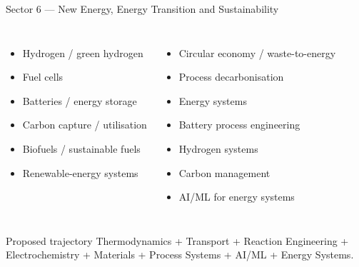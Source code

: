 \documentclass[aspectratio=169,11pt]{beamer}
\begin{document}
\begin{frame}{Sector 6 — New Energy, Energy Transition and Sustainability}
\begin{columns}[T]
\begin{itemize}
\item Hydrogen / green hydrogen
\item Fuel cells
\item Batteries / energy storage
\item Carbon capture / utilisation
\item Biofuels / sustainable fuels
\item Renewable-energy systems
\end{itemize}
\begin{itemize}
\item Circular economy / waste-to-energy
\item Process decarbonisation
\item Energy systems
\item Battery process engineering
\item Hydrogen systems
\item Carbon management
\item AI/ML for energy systems
\end{itemize}
\end{columns}
\vspace{5mm}
\begin{block}{Proposed trajectory}
Thermodynamics + Transport + Reaction Engineering + Electrochemistry + Materials + Process Systems + AI/ML + Energy Systems.
\end{block}
\end{frame}
\end{document}
